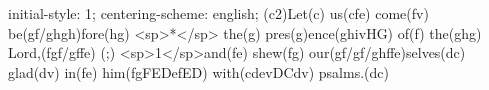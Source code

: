 initial-style: 1;
centering-scheme: english;
(c2)Let(c) us(cfe) come(fv) be(gf/ghgh)fore(hg) <sp>*</sp> the(g) pres(g)ence(ghivHG) of(f) the(ghg) Lord,(fgf/gffe) (;) <sp>1</sp>and(fe) shew(fg) our(gf/gf/ghffe)selves(dc) glad(dv) in(fe) him(fgFEDefED) with(cdevDCdv) psalms.(dc)

